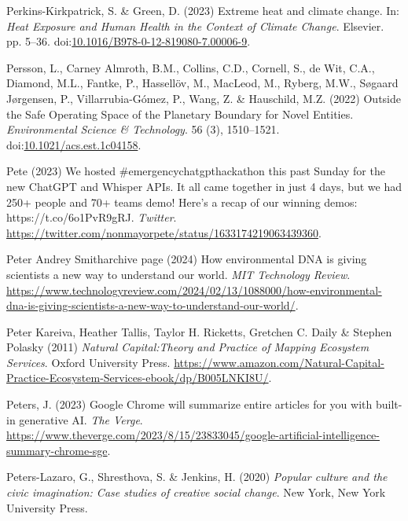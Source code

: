 \documentclass[
  letterpaper,
  DIV=11,
  numbers=noendperiod]{scrartcl}
\newlength{\cslhangindent}
\newenvironment{CSLReferences}[2] %
 {\begin{list}{}{%
  \setlength{\itemindent}{0pt}
  \setlength{\leftmargin}{0pt}
  \setlength{\parsep}{0pt}
  \ifodd #1
   \setlength{\leftmargin}{\cslhangindent}
   \setlength{\itemindent}{-1\cslhangindent}
  \fi
  \setlength{\itemsep}{#2\baselineskip}}}
 {\end{list}}
\begin{document}
\begin{CSLReferences}{0}{1}
Perkins-Kirkpatrick, S. \& Green, D. (2023) Extreme heat and climate
change. In: \emph{Heat {Exposure} and {Human Health} in the {Context} of
{Climate Change}}. Elsevier. pp. 5--36.
doi:\href{https://doi.org/10.1016/B978-0-12-819080-7.00006-9}{10.1016/B978-0-12-819080-7.00006-9}.

Persson, L., Carney Almroth, B.M., Collins, C.D., Cornell, S., de Wit,
C.A., Diamond, M.L., Fantke, P., Hassellöv, M., MacLeod, M., Ryberg,
M.W., Søgaard Jørgensen, P., Villarrubia-Gómez, P., Wang, Z. \&
Hauschild, M.Z. (2022) Outside the {Safe Operating Space} of the
{Planetary Boundary} for {Novel Entities}. \emph{Environmental Science
\& Technology}. 56 (3), 1510--1521.
doi:\href{https://doi.org/10.1021/acs.est.1c04158}{10.1021/acs.est.1c04158}.

Pete (2023) We hosted \#emergencychatgpthackathon this past {Sunday} for
the new {ChatGPT} and {Whisper APIs}. {It} all came together in just 4
days, but we had 250+ people and 70+ teams demo! {Here}'s a recap of our
winning demos: {https://t.co/6o1PvR9gRJ}. \emph{Twitter}.
\url{https://twitter.com/nonmayorpete/status/1633174219063439360}.

Peter Andrey Smitharchive page (2024) How environmental {DNA} is giving
scientists a new way to understand our world. \emph{MIT Technology
Review}.
\url{https://www.technologyreview.com/2024/02/13/1088000/how-environmental-dna-is-giving-scientists-a-new-way-to-understand-our-world/}.

Peter Kareiva, Heather Tallis, Taylor H. Ricketts, Gretchen C. Daily \&
Stephen Polasky (2011) \emph{Natural {Capital}:{Theory} and {Practice}
of {Mapping Ecosystem Services}}. Oxford University Press.
\url{https://www.amazon.com/Natural-Capital-Practice-Ecosystem-Services-ebook/dp/B005LNKI8U/}.

Peters, J. (2023) Google {Chrome} will summarize entire articles for you
with built-in generative {AI}. \emph{The Verge}.
\url{https://www.theverge.com/2023/8/15/23833045/google-artificial-intelligence-summary-chrome-sge}.

Peters-Lazaro, G., Shresthova, S. \& Jenkins, H. (2020) \emph{Popular
culture and the civic imagination: Case studies of creative social
change}. New York, New York University Press.


\end{CSLReferences}
\end{document}
